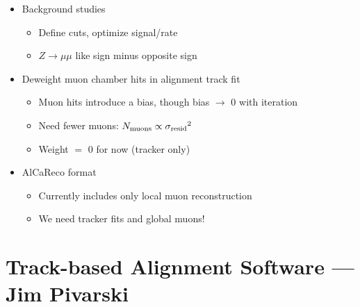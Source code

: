 \documentclass[compress]{beamer}
\begin{document}
\begin{frame}
  \vspace{-0.3 cm}
  \begin{itemize}\setlength{\itemsep}{0.3 cm}
    \item<2-> Background studies
      \begin{itemize}
        \item Define cuts, optimize signal/rate
	\item $Z\to\mu\mu$ like sign minus opposite sign
      \end{itemize}

    \item<3-> Deweight muon chamber hits in alignment track fit
      \begin{itemize}
	\item Muon hits introduce a bias, though bias $\to$ 0 with iteration
	\item Need fewer muons: $N_{\mbox{\scriptsize muons}} \propto {\sigma_{\mbox{\scriptsize resid}}}^2$
	\item Weight $=$ 0 for now (tracker only)
      \end{itemize}

    \item<4-> AlCaReco format
      \begin{itemize}
	\item Currently includes only local muon reconstruction
	\item We need tracker fits and global muons!
      \end{itemize}

  \end{itemize}
\end{frame}

\section*{Track-based Alignment Software --- Jim Pivarski}
\end{document}
